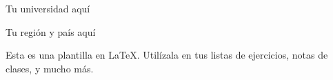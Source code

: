 \vspace*{-0.25in}
\centerline{Tu universidad aqu\'i}
\centerline{Tu regi\'on y pa\'is aqu\'i}
\centerline{}
\vspace*{0.15in}

\begin{framed}
    Esta es una plantilla en \LaTeX.
    Util\'izala en tus listas de ejercicios, notas de clases, y mucho m\'as.
\end{framed}
